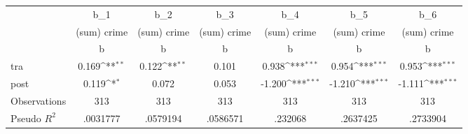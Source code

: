 {
\def\sym#1{\ifmmode^{#1}\else\(^{#1}\)\fi}
\begin{tabular}{l*{6}{c}}
\toprule
                    &         b\_1         &         b\_2         &         b\_3         &         b\_4         &         b\_5         &         b\_6         \\
                    & (sum) crime         & (sum) crime         & (sum) crime         & (sum) crime         & (sum) crime         & (sum) crime         \\
                    &           b         &           b         &           b         &           b         &           b         &           b         \\
\midrule
tra                 &       0.169\sym{**} &       0.122\sym{**} &       0.101         &       0.938\sym{***}&       0.954\sym{***}&       0.953\sym{***}\\
post                &       0.119\sym{*}  &       0.072         &       0.053         &      -1.200\sym{***}&      -1.210\sym{***}&      -1.111\sym{***}\\
\midrule
Observations        &         313         &         313         &         313         &         313         &         313         &         313         \\
Pseudo \(R^{2}\)    &    .0031777         &    .0579194         &    .0586571         &     .232068         &    .2637425         &    .2733904         \\
\bottomrule
\end{tabular}
}
